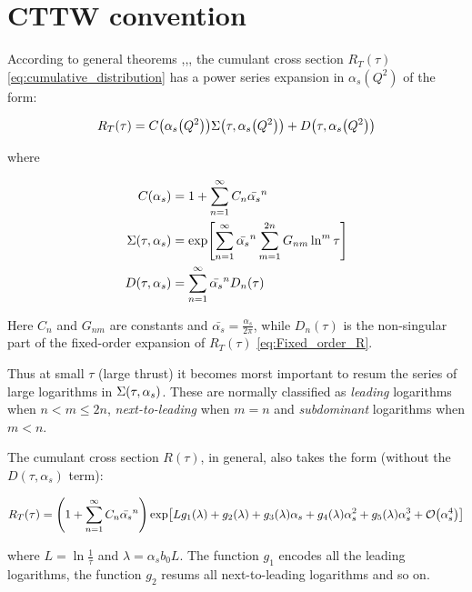 \documentclass[../main.tex]{subfiles}
\begin{document}
\section{CTTW convention}\label{sec:CTTW convention}

According to general theorems \cite{Block:1937},\cite{Kinoshita:1962ur},\cite{Lee:1964is}, 
the cumulant cross section $R_T(\tau)$ \cref{eq:cumulative_distribution} has a power series expansion in $\alpha_s(Q^2)$ of the form:

\begin{equation}\label{eq:cumulant_expansion}
    R_T(\tau) =  C\qty(\alpha_s\qty(Q^2))\Sigma\qty(\tau,\alpha_s\qty(Q^2)) + D\qty(\tau,\alpha_s\qty(Q^2))
\end{equation}

where 

\begin{align}
    C\qty(\alpha_s) &= 1 + \sum_{n=1}^{\infty} C_n \bar{\alpha_s}^n \\
    \Sigma\qty(\tau,\alpha_s)&= \exp[\sum_{n=1}^\infty \bar{\alpha_s}^n \sum_{m=1}^{2n}G_{nm}\ln^m\tau] \label{eq:sigma}\\
    D(\tau,\alpha_s) &= \sum_{n=1}^{\infty} \bar{\alpha_s}^n D_n(\tau)
\end{align}

Here $C_n$ and $G_{nm}$ are constants and $\bar{\alpha_s} = \frac{\alpha_s}{2\pi}$, while $D_n(\tau)$ 
is the non-singular part of the fixed-order expansion of $R_T(\tau)$ \cref{eq:Fixed_order_R}.

Thus at small $\tau$ (large thrust) it becomes morst important to resum the series of large logarithms in $\Sigma\qty(\tau,\alpha_s)$.
These are normally classified as \emph{leading} logarithms when $n < m \le 2n$, \emph{next-to-leading} when $m = n$ 
and \emph{subdominant} logarithms when $m < n$. 

The cumulant cross section $R(\tau)$, in general, also takes the form (without the $D(\tau,\alpha_s)$ term):

\begin{equation}\label{eq:resummed_R}
    R_T(\tau) = \qty(1 + \sum_{n=1}^{\infty} C_n \bar{\alpha_s}^n)\exp[L g_1(\lambda)  + g_2(\lambda) + g_3(\lambda) \alpha_s + g_4(\lambda) \alpha_s^2 + g_5(\lambda) \alpha_s^3 + \order{\alpha_s^4}]
\end{equation}

where $L = \ln \frac{1}{\tau}$ and $\lambda = \alpha_s b_0 L$. The function $g_1$ encodes all the leading logarithms, the function $g_2$
resums all next-to-leading logarithms and so on.
\end{document}
